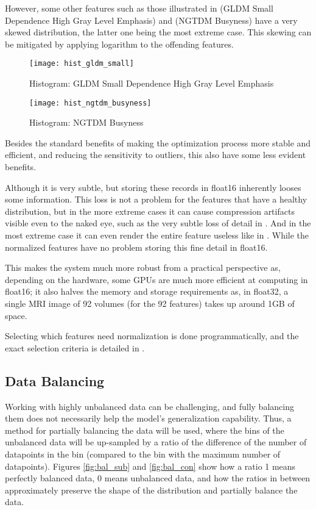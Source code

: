However, some other features such as those illustrated in  (GLDM Small Dependence High Gray Level Emphasis) and  (NGTDM Busyness) have a very skewed distribution, the latter one being the most extreme case. This skewing can be mitigated by applying logarithm to the offending features.

\begin{figure}[H]
\centering
\texttt{[image: hist\_gldm\_small]}
\caption{Histogram: GLDM Small Dependence High Gray Level Emphasis}
\label{fig:hist_gls}
\end{figure}

\begin{figure}[H]
\centering
\texttt{[image: hist\_ngtdm\_busyness]}
\caption{Histogram: NGTDM Busyness}
\label{fig:hist_ngb}
\end{figure}

Besides the standard benefits of making the optimization process more stable and efficient, and reducing the sensitivity to outliers, this also have some less evident benefits.\par
Although it is very subtle, but storing these records in float16 inherently looses some information. This loss is not a problem for the features that have a healthy distribution, but in the more extreme cases it can cause compression artifacts visible even to the naked eye, such as the very subtle loss of detail in . And in the most extreme case it can even render the entire feature useless like in . While the normalized features have no problem storing this fine detail in float16.\par
This makes the system much more robust from a practical perspective as, depending on the hardware, some GPUs are much more efficient at computing in float16; it also halves the memory and storage requirements as, in float32, a single \ac{MRI} image of 92 volumes (for the 92 features) takes up around 1GB of space.\par
Selecting which features need normalization is done programmatically, and the exact selection criteria is detailed in .

\subsection{Data Balancing}

Working with highly unbalanced data can be challenging, and fully balancing them does not necessarily help the model's generalization capability. Thus, a method for partially balancing the data will be used, where the bins of the unbalanced data will be up-sampled by a ratio of the difference of the number of datapoints in the bin (compared to the bin with the maximum number of datapoints). Figures \ref{fig:bal_sub} and \ref{fig:bal_con} show how a ratio 1 means perfectly balanced data, 0 means unbalanced data, and how the ratios in between approximately preserve the shape of the distribution and partially balance the data.

